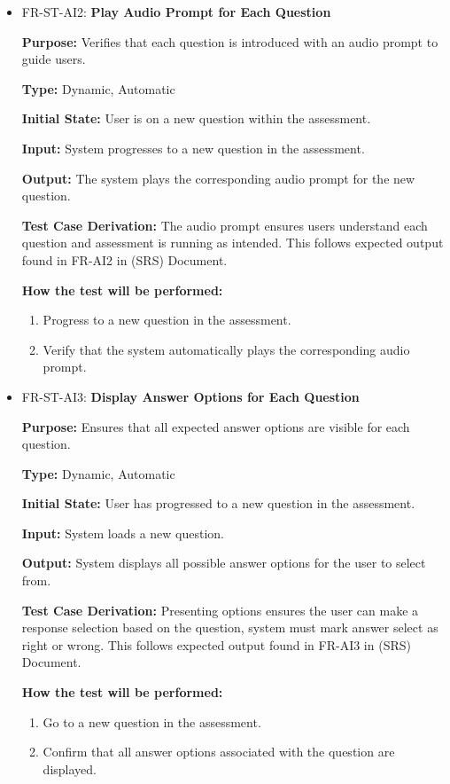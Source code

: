 \documentclass[12pt, titlepage]{article}
\begin{document}
\begin{itemize}
  \item FR-ST-AI2: \textbf{Play Audio Prompt for Each Question}
  \begin{mdframed}[linewidth=0.5mm]
      \textbf{Purpose:} Verifies that each question is introduced with an audio prompt to guide users. \par
      \textbf{Type:} Dynamic, Automatic \par
      \textbf{Initial State:} User is on a new question within the assessment. \par
      \textbf{Input:} System progresses to a new question in the assessment. \par
      \textbf{Output:} The system plays the corresponding audio prompt for the new question. \par
      \textbf{Test Case Derivation:} The audio prompt ensures users understand each question and assessment is running as intended.
      This follows expected output found in FR-AI2 in (SRS) Document. \par
      \textbf{How the test will be performed:}
      \begin{enumerate}[noitemsep]
        \item Progress to a new question in the assessment.
        \item Verify that the system automatically plays the corresponding audio prompt.
      \end{enumerate}
  \end{mdframed}

  \item FR-ST-AI3: \textbf{Display Answer Options for Each Question}
  \begin{mdframed}[linewidth=0.5mm]
      \textbf{Purpose:} Ensures that all expected answer options are visible for each question. \par
      \textbf{Type:} Dynamic, Automatic \par
      \textbf{Initial State:} User has progressed to a new question in the assessment. \par
      \textbf{Input:} System loads a new question. \par
      \textbf{Output:} System displays all possible answer options for the user to select from. \par
      \textbf{Test Case Derivation:} Presenting options ensures the user can make a response selection based
       on the question, system must mark answer select as right or wrong. 
       This follows expected output found in FR-AI3 in (SRS) Document. \par
      \textbf{How the test will be performed:}
      \begin{enumerate}[noitemsep]
        \item Go to a new question in the assessment.
        \item Confirm that all answer options associated with the question are displayed.
      \end{enumerate}
  \end{mdframed}


\end{itemize}
\end{document}
